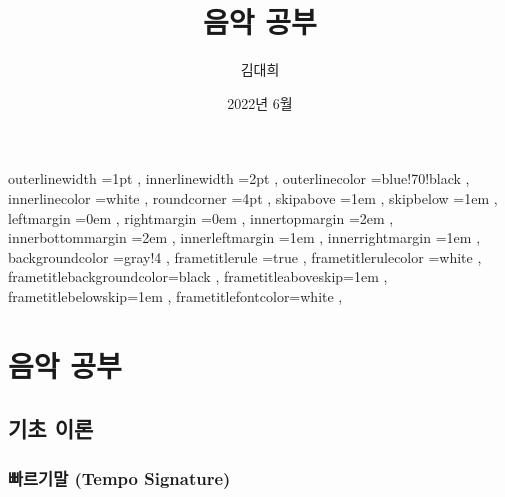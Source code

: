 \documentclass[12pt, a4paper, oneside]{book}
\let\stdsection\section
\renewcommand\section{\newpage\stdsection}
\begin{document}
	
			\dominitoc
			\doparttoc			




			\title{음악 공부}
			\author{김대희}
			\date{2022년 6월}
			\maketitle


			\tableofcontents 		%
			\cleardoublepage
			\listoftables 			%





		 {
						outerlinewidth		=1pt			,%
						innerlinewidth		=2pt			,%
						outerlinecolor		=blue!70!black	,%
						innerlinecolor		=white 			,%
						roundcorner			=4pt			,%
						skipabove			=1em 			,%
						skipbelow			=1em 			,%
						leftmargin			=0em			,%
						rightmargin			=0em			,%
						innertopmargin		=2em 			,%
						innerbottommargin 	=2em 			,%
						innerleftmargin		=1em 			,%
						innerrightmargin		=1em 			,%
						backgroundcolor		=gray!4			,%
						frametitlerule		=true 			,%
						frametitlerulecolor	=white			,%
						frametitlebackgroundcolor=black		,%
						frametitleaboveskip=1em 			,%
						frametitlebelowskip=1em 			,%
						frametitlefontcolor=white 			,%
						}



	\part{음악 공부}
	\noptcrule
	\parttoc				

%
%
%
\chapter{기초 이론}



%
	\section{빠르기말 (Tempo Signature)}
\end{document}
